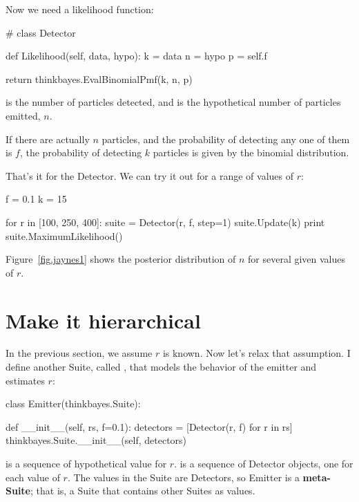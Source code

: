 \documentclass[12pt]{book}
\theoremstyle{exercise}
\begin{document}
Now we need a likelihood function:

\begin{code}
# class Detector

    def Likelihood(self, data, hypo):
        k = data
        n = hypo
        p = self.f

        return thinkbayes.EvalBinomialPmf(k, n, p)
\end{code}

 is the number of particles detected, and  is
the hypothetical number of particles emitted, $n$.

If there are actually $n$ particles, and the probability of detecting
any one of them is $f$, the probability of detecting $k$ particles is
given by the binomial distribution.

That's it for the Detector.  We can try it out for a range
of values of $r$:

\begin{code}
    f = 0.1
    k = 15

    for r in [100, 250, 400]:
        suite = Detector(r, f, step=1)
        suite.Update(k)
        print suite.MaximumLikelihood()
\end{code}

Figure~\ref{fig.jaynes1} shows the posterior distribution of $n$ for
several given values of $r$.


\section{Make it hierarchical}

In the previous section, we assume $r$ is known.  Now let's
relax that assumption.  I define another Suite, called ,
that models the behavior of the emitter and estimates $r$:

\begin{code}
class Emitter(thinkbayes.Suite):

    def __init__(self, rs, f=0.1):
        detectors = [Detector(r, f) for r in rs]
        thinkbayes.Suite.__init__(self, detectors)
\end{code}

 is a sequence of hypothetical value for $r$.  
is a sequence of Detector objects, one for each value of $r$.  The
values in the Suite are Detectors, so Emitter is a {\bf meta-Suite};
that is, a Suite that contains other Suites as values.
\end{document}
